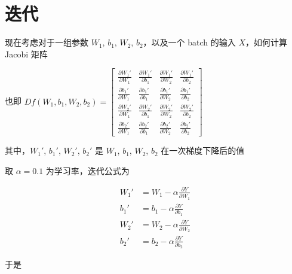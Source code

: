 \documentclass[12pt,a4paper]{amsart}
\begin{document}
\section{迭代}

现在考虑对于一组参数 $W_1$, $b_1$, $W_2$, $b_2$，以及一个 batch 的输入 $X$，如何计算 Jacobi 矩阵

也即 $Df(W_1, b_1, W_2, b_2) = \begin{bmatrix}
		\frac{\partial {W_1}'}{\partial W_1} & \frac{\partial {W_1}'}{\partial b_1} & \frac{\partial {W_1}'}{\partial W_2} & \frac{\partial {W_1}'}{\partial b_2} \\
		\frac{\partial {b_1}'}{\partial W_1} & \frac{\partial {b_1}'}{\partial b_1} & \frac{\partial {b_1}'}{\partial W_2} & \frac{\partial {b_1}'}{\partial b_2} \\
		\frac{\partial {W_2}'}{\partial W_1} & \frac{\partial {W_2}'}{\partial b_1} & \frac{\partial {W_2}'}{\partial W_2} & \frac{\partial {W_2}'}{\partial b_2} \\
		\frac{\partial {b_2}'}{\partial W_1} & \frac{\partial {b_2}'}{\partial b_1} & \frac{\partial {b_2}'}{\partial W_2} & \frac{\partial {b_2}'}{\partial b_2}
	\end{bmatrix}$

其中，$W_1'$, $b_1'$, $W_2'$, $b_2'$ 是 $W_1$, $b_1$, $W_2$, $b_2$ 在一次梯度下降后的值

取 $\alpha = 0.1$ 为学习率，迭代公式为

\begin{equation}
	\begin{aligned}
		{W_1}' & = W_1 - \alpha \frac{\partial Y}{\partial W_1} \\
		{b_1}' & = b_1 - \alpha \frac{\partial Y}{\partial b_1} \\
		{W_2}' & = W_2 - \alpha \frac{\partial Y}{\partial W_2} \\
		{b_2}' & = b_2 - \alpha \frac{\partial Y}{\partial b_2}
	\end{aligned}
\end{equation}

于是
\end{document}
